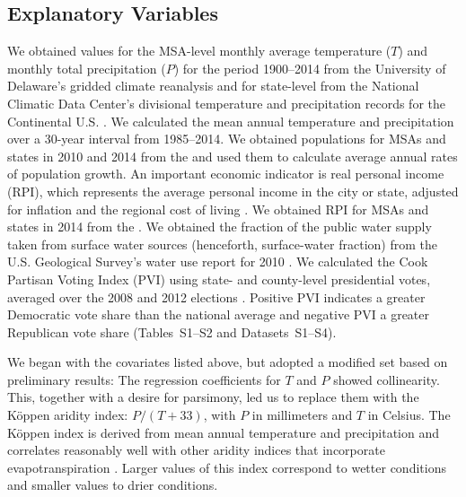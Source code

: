 \documentclass[draft,linenumbers]{agujournal}
\begin{document}
\subsection{Explanatory Variables}
We obtained values for the MSA-level
monthly average
temperature ($T$) and monthly total precipitation ($P$) for the period
1900--2014
from the University of Delaware's gridded climate reanalysis
\citep{matsuura:gridded.temp:2015,matsuura:gridded.precip:2015}
and for state-level from the National Climatic Data Center's divisional
temperature and precipitation records for the Continental U.S.
\citep{vose:nclimdiv:2014}.
We calculated the mean annual temperature and precipitation over a
30-year interval from 1985--2014.
We obtained populations for MSAs and states in 2010 and 2014
from the \citet{census:population:2015} and used them to calculate average
annual rates of population growth.
An important economic indicator is real personal income (RPI),
which represents the average personal income in the city or state, adjusted for
inflation and the regional cost of living \citep{bea:rpp.methodology:2016}.
We obtained RPI for MSAs and states in 2014
from the \citet{bea:rpi:2016}.
We obtained the
fraction of the public water supply taken from surface water sources
(henceforth, surface-water fraction) from the U.S. Geological
Survey's water use report for 2010 \citep{maupin:water.use:2014}.
We calculated the Cook Partisan Voting Index (PVI)
using state- and county-level presidential votes, averaged over the 2008 and 2012
elections \citep{cook:pvi:2013,cq:elections:2016}.
Positive PVI indicates a greater Democratic vote share than the national average
and negative PVI a greater Republican vote share
(Tables~S1--S2 and Datasets~S1--S4).

We began with the covariates listed above, but adopted a modified set based on
preliminary results: The regression coefficients for $T$ and $P$ showed
collinearity.
This, together with a desire for parsimony, led us to replace them with the
K\"oppen aridity index: $P / (T + 33)$, with $P$ in millimeters and $T$ in
Celsius.
The K\"oppen index is
derived from mean annual temperature and precipitation
and correlates reasonably well with other aridity indices
that incorporate evapotranspiration
\citep{quan:aridity:2013}.
Larger values of this index correspond to wetter conditions
and smaller values to drier conditions.
\end{document}
